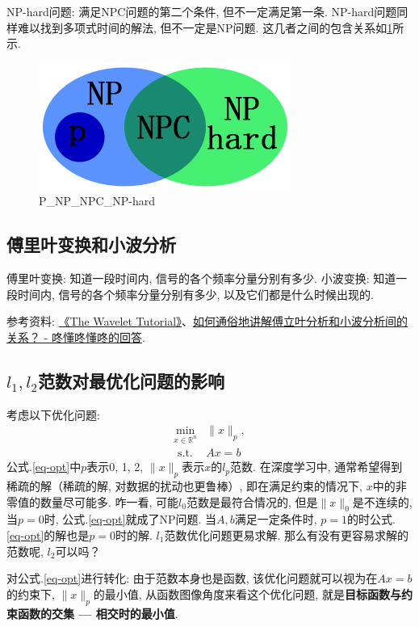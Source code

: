 NP-hard问题: 满足NPC问题的第二个条件, 但不一定满足第一条. NP-hard问题同样难以找到多项式时间的解法, 但不一定是NP问题. 这几者之间的包含关系如\ref{fig:P-NP-NPC-NP-hard}所示. 

\begin{figure}[h]
	\centering
	\includegraphics[width=.4\textwidth]{pics/P-NP-NPC-NP-hard.jpeg}
	\caption{P\_NP\_NPC\_NP-hard}
	\label{fig:P-NP-NPC-NP-hard}
\end{figure}



\subsection{傅里叶变换和小波分析}
傅里叶变换: 知道一段时间内, 信号的各个频率分量分别有多少. 
小波变换: 知道一段时间内, 信号的各个频率分量分别有多少, 以及它们都是什么时候出现的. 

参考资料: \href{https://cseweb.ucsd.edu/~baden/Doc/wavelets/polikar_wavelets.pdf}{《The Wavelet Tutorial》}、\href{https://www.zhihu.com/question/22864189/answer/40772083}{如何通俗地讲解傅立叶分析和小波分析间的关系？ - 咚懂咚懂咚的回答}. 

\subsection{$l_1, l_2$范数对最优化问题的影响}
考虑以下优化问题: 
\begin{equation}
	\begin{aligned}
		\min _{x \in \mathbb{R}^{n}} &\|x\|_{p}, \\
		\text { s.t. } & A x=b \label{eq-opt}
	\end{aligned}
\end{equation}
公式.\ref{eq-opt}中$p$表示0, 1, 2, $\|x\|_{p}$表示$x$的$l_p$范数. 
在深度学习中, 通常希望得到稀疏的解（稀疏的解, 对数据的扰动也更鲁棒）, 即在满足约束的情况下, $x$中的非零值的数量尽可能多. 咋一看, 可能$l_0$范数是最符合情况的, 但是$\|x\|_0$是不连续的, 当$p=0$时, 公式.\ref{eq-opt}就成了NP问题. 当$A, b$满足一定条件时, $p=1$的时公式.\ref{eq-opt}的解也是$p=0$时的解. $l_1$范数优化问题更易求解. 那么有没有更容易求解的范数呢, $l_2$可以吗？

对公式.\ref{eq-opt}进行转化: 由于范数本身也是函数, 该优化问题就可以视为在$A x = b$的约束下, $\|x\|_p$的最小值, 从函数图像角度来看这个优化问题, 就是\textbf{目标函数与约束函数的交集 --- 相交时的最小值}. 

